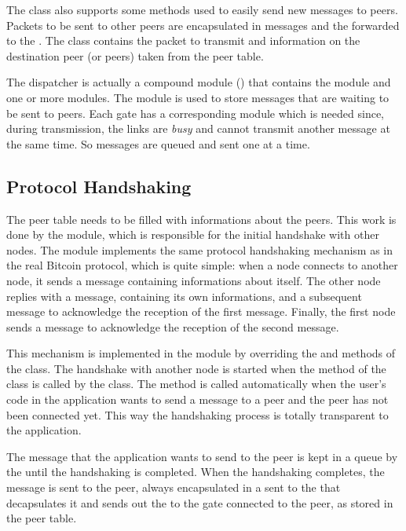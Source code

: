 The  class also supports some methods used to easily send new
messages to peers. Packets to be sent to other peers are encapsulated in
 messages and the forwarded to the . The
 class contains the packet to transmit and information
on the destination peer (or peers) taken from the peer table.

The dispatcher is actually a compound module () that
contains the  module and one or more  modules.
The  module is used to store messages that are waiting to be
sent to peers. Each gate has a corresponding  module which is
needed since, during transmission, the links are \emph{busy} and cannot
transmit another message at the same time. So messages are queued and sent one
at a time.

\subsection{Protocol Handshaking}\label{subsec:handshaking}

The peer table needs to be filled with informations about the peers. This work
is done by the  module, which is responsible for the
initial handshake with other nodes. The  module
implements the same protocol handshaking mechanism as in the real Bitcoin
protocol, which is quite simple: when a node connects to another node, it sends
a  message containing informations about itself. The other node
replies with a  message, containing its own informations, and a
subsequent  message to acknowledge the reception of the first
message. Finally, the first node sends a  message to acknowledge
the reception of the second  message.

This mechanism is implemented in the  module by
overriding the  and 
methods of the  class. The handshake with another node is started
when the  method of the  class is
called by the  class. The method is called automatically when the
user's code in the application wants to send a message to a peer and the peer
has not been connected yet. This way the handshaking process is totally
transparent to the application.

The message that the application wants to send to the peer is kept in a queue
by the  until the handshaking is completed. When the handshaking
completes, the message is sent to the peer, always encapsulated in a
 sent to the  that decapsulates it and
sends out the  to the gate connected to the peer, as stored in the
peer table.

